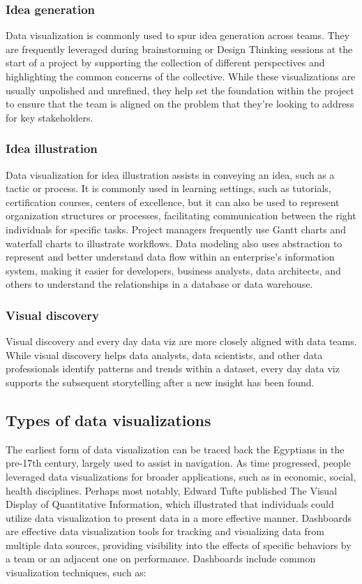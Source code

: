 \documentclass[MSE,Master,english]{twbook}%
\begin{document}
\subsubsection{Idea generation}
Data visualization is commonly used to spur idea generation across teams. They are frequently leveraged during brainstorming or Design Thinking sessions at the start of a project by supporting the collection of different perspectives and highlighting the common concerns of the collective. While these visualizations are usually unpolished and unrefined, they help set the foundation within the project to ensure that the team is aligned on the problem that they're looking to address for key stakeholders.

\subsubsection{Idea illustration}
Data visualization for idea illustration assists in conveying an idea, such as a tactic or process. It is commonly used in learning settings, such as tutorials, certification courses, centers of excellence, but it can also be used to represent organization structures or processes, facilitating communication between the right individuals for specific tasks. Project managers frequently use Gantt charts and waterfall charts to illustrate workflows. Data modeling also uses abstraction to represent and better understand data flow within an enterprise's information system, making it easier for developers, business analysts, data architects, and others to understand the relationships in a database or data warehouse.

\subsubsection{Visual discovery}
Visual discovery and every day data viz are more closely aligned with data teams. While visual discovery helps data analysts, data scientists, and other data professionals identify patterns and trends within a dataset, every day data viz supports the subsequent storytelling after a new insight has been found.

\subsection{Types of data visualizations}
The earliest form of data visualization can be traced back the Egyptians in the pre-17th century\cite{dataviz}, largely used to assist in navigation. As time progressed, people leveraged data visualizations for broader applications, such as in economic, social, health disciplines. Perhaps most notably, Edward Tufte published The Visual Display of Quantitative Information\cite{tufte1985visual}, which illustrated that individuals could utilize data visualization to present data in a more effective manner. Dashboards are effective data visualization tools for tracking and visualizing data from multiple data sources, providing visibility into the effects of specific behaviors by a team or an adjacent one on performance. Dashboards include common visualization techniques, such as:
\end{document}
